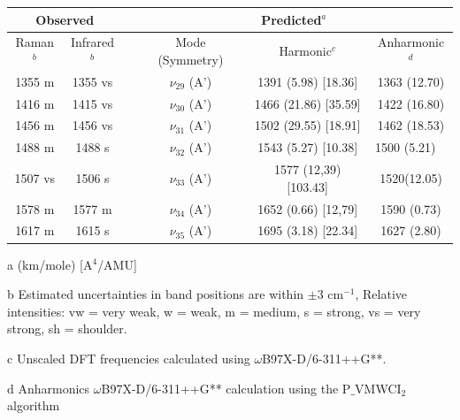 	
	
	
	
	
		\begin{table}[H]
			\begin{center}
			\begin{threeparttable}
				\begin{tabular}{c c c c c c}
					\hline
					\multicolumn{ 2}{c}{Observed} & \multicolumn{1}{c}{} & \multicolumn{ 3}{c}{Predicted$^{a}$} \\ \hline
					Raman$^{b}$ & \multicolumn{1}{c}{Infrared$^{b}$} &  & \multicolumn{1}{c}{Mode (Symmetry)} & \multicolumn{1}{c}{Harmonic$^{c}$} & Anharmonic$^{d}$ \\ \hline

 1355 m & 1355 vs &  &  $\nu_{29}$ (A’) & 1391 (5.98) [18.36]&   1363 (12.70) \\ 
  1416 m & 1415 vs &  & $\nu_{30}$ (A’) & 1466 (21.86) [35.59] & 1422 (16.80) \\ 
 1456 m & 1456 vs &  &  $\nu_{31}$ (A’) & 1502 (29.55) [18.91] & 1462 (18.53)
 \\ 
 1488 m & 1488 s &  & $\nu_{32}$ (A’) & 1543 (5.27) [10.38] & \multicolumn{1}{l}{      1500 (5.21)
 } \\	
	1507 vs & 1506 s &  & $\nu_{33}$ (A’)	& 1577 (12,39) [103.43]	& 1520(12.05)
	\\ 
	1578 m & 1577 m &  & $\nu_{34}$ (A’) & 1652 (0.66) [12,79] & 1590 (0.73) \\ 
	1617 m & 1615 s &  & $\nu_{35}$ (A’)& 1695 (3.18) [22.34]	& 1627 (2.80)\\
	\bottomrule
	
		\end{tabular}
		
				\begin{tablenotes}
					\item[a] (km/mole) [A$^{4}$/AMU]
					\item[b] Estimated uncertainties in band positions are within $\pm$3 cm$^{-1}$, Relative intensities: vw = very weak, w = weak, m = medium, s = strong, vs = very strong, sh = shoulder.
					\item[c] Unscaled DFT frequencies calculated using $\omega$B97X-D/6-311++G**.
					\item[d] Anharmonics $\omega$B97X-D/6-311++G** calculation using the P$\_$VMWCI$_{2}$ algorithm
				\end{tablenotes}
			\end{threeparttable}
		\end{center}
		\label{freq-Indole}
	\end{table}
	
